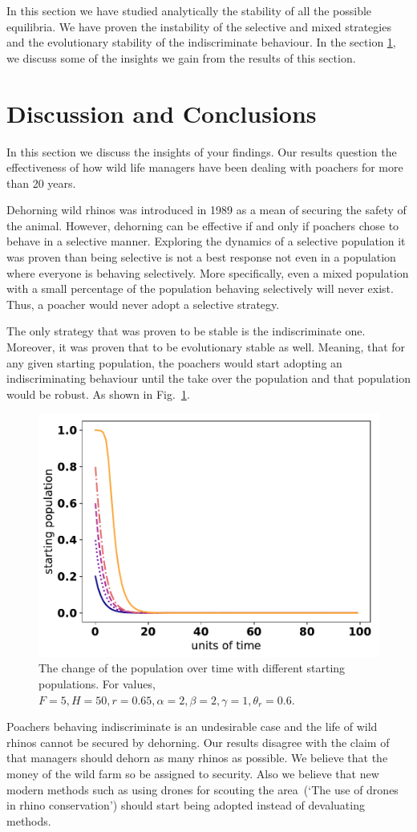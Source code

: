 \documentclass[10pt]{article}
\begin{document}
In this section we have studied analytically the stability of all the possible
equilibria. We have proven the instability of the selective and mixed strategies
and the evolutionary stability of the indiscriminate behaviour. In the section
\ref{section:discussion}, we discuss some of the insights we
gain from the results of this section.

\section{Discussion and Conclusions}
\label{section:discussion}

In this section we discuss the insights of your findings. Our results question
the effectiveness of how wild life managers have been dealing with poachers
for more than 20 years. 

Dehorning wild rhinos was introduced in 1989 as a mean of securing the
safety of the animal. However, dehorning can be effective if and only if
poachers chose to behave in a selective manner. Exploring the
dynamics of a selective population it was proven than being selective is not
a best response not even in a population where everyone is behaving selectively.
More specifically, even a mixed population with a small percentage of the 
population behaving selectively will never exist. Thus, a poacher would never
adopt a selective strategy. 

The only strategy that was proven to be stable is the indiscriminate one.
Moreover, it was proven that to be evolutionary stable as well. Meaning, 
that for any given starting population, the poachers would start adopting an
indiscriminating behaviour until the take over the population and that population
would be robust. As shown in Fig.~\ref{fig:indiscriminate_ess}.

\begin{figure}[!htbp]
	\centering
	\includegraphics[width=0.4\linewidth]{images/IndiscriminateESS.pdf}
	\caption{\label{fig:indiscriminate_ess} The change of the population over 
	time with different starting populations. For values, \(F=5, H=50, r=0.65, 
	\alpha=2, \beta=2, \gamma=1, \theta_r=0.6\).}
\end{figure}

Poachers behaving indiscriminate is an undesirable case and the life of
wild rhinos cannot be secured by dehorning. Our results disagree with the
claim of~\cite{Milner1992} that managers should dehorn
as many rhinos as possible. We believe that the money of the wild farm 
so be assigned to security. Also we believe that new modern methods such as
using drones for scouting the area~\cite{Saverhino}(`The use of drones in rhino
conservation') should start being adopted instead of devaluating methods.



\end{document}
